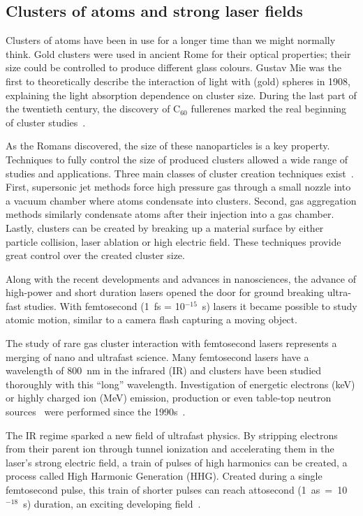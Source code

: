 \subsection{Clusters of atoms and strong laser fields}

Clusters of atoms have been in use for a longer time than we might normally
think. Gold clusters were used in ancient Rome for their optical
properties; their size could be controlled to produce different glass colours.
Gustav Mie was the first to theoretically describe the interaction of light
with (gold) spheres in 1908, explaining the light absorption dependence
on cluster size. During the last part of the twentieth century, the discovery of
C$_{60}$ fullerenes marked the real beginning of cluster studies~\cite{Reinhard2004}.

As the Romans discovered, the size of these nanoparticles is a key property. Techniques to fully
control the size of produced clusters allowed a wide range of studies and
applications. Three main classes of cluster creation techniques
exist~\cite{Reinhard2004}. First, supersonic jet methods force high pressure
gas through a small nozzle into a vacuum chamber where atoms condensate into
clusters. Second, gas aggregation methods similarly condensate atoms after
their injection into a gas chamber. Lastly, clusters can be created by breaking
up a material surface by either particle collision, laser ablation or high
electric field. These techniques provide great control over the created cluster
size.

Along with the recent developments and advances in nanosciences,
the advance of high-power and short duration lasers opened the
door for ground breaking ultra-fast studies. With femtosecond
(1~fs = 10$^{-15}$~s) lasers it became possible to study atomic motion,
similar to a camera flash capturing a moving object.


The study of rare gas cluster interaction with femtosecond lasers represents a
merging of nano and ultrafast science.
%
Many femtosecond lasers
have a wavelength of 800~nm in the infrared (IR) and clusters have been studied
thoroughly with this ``long'' wavelength. Investigation of energetic
electrons (keV) or highly charged ion (MeV) emission, \xray production or even
table-top neutron sources~\cite{Krainov2007} were performed since the
1990s~\cite{Haberland1994,Brabec2009}.


The IR regime sparked a new field of ultrafast physics. By stripping electrons
from their parent ion through tunnel ionization and accelerating them in the
laser's strong electric field, a train of pulses of high harmonics can be created,
a process called High Harmonic Generation (HHG).
Created during a single femtosecond pulse, this train of shorter pulses
can reach attosecond \mbox{(1 as = 10$^{-18}$ s)} duration, an exciting
developing field~\cite{Levesque2006}.



